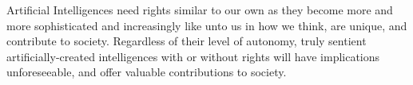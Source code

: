 Artificial Intelligences need rights similar to our own as they become more and more sophisticated and increasingly like unto us in how we think, are unique, and contribute to society. Regardless of their level of autonomy, truly sentient artificially-created intelligences with or without rights will have implications unforeseeable, and offer valuable contributions to society.